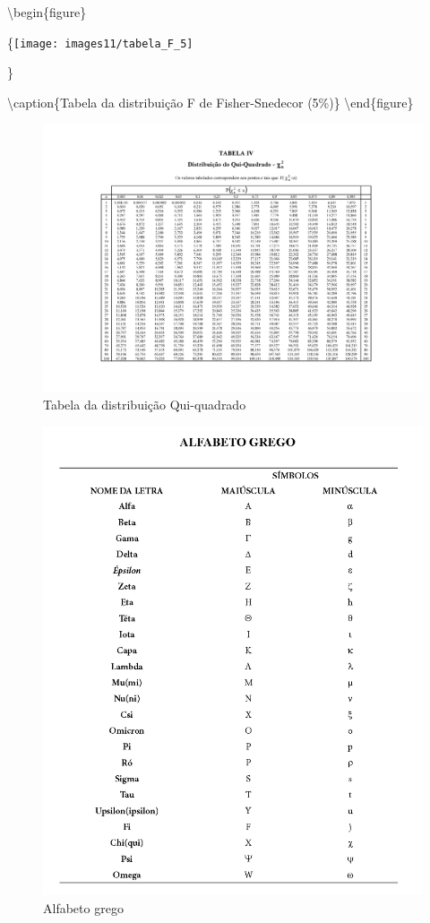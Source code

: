 \documentclass[
]{book}
\begin{document}
\hfill\break

\textbackslash begin\{figure\}

\{\centering \texttt{[image: images11/tabela\_F\_5]}

\}

\textbackslash caption\{Tabela da distribuição F de Fisher-Snedecor (5\%)\}\label{fig:unnamed-chunk-141}
\textbackslash end\{figure\}

\hfill\break

\begin{figure}

{\centering \includegraphics[width=1\linewidth]{images11/Tabela_QuiQuadrado} 

}

\caption{Tabela da distribuição Qui-quadrado}\label{fig:unnamed-chunk-142}
\end{figure}

\hfill\break

\begin{figure}

{\centering \includegraphics[width=0.8\linewidth]{images11/alfabeto_grego} 

}

\caption{Alfabeto grego}\label{fig:unnamed-chunk-143}
\end{figure}

  
\end{document}

